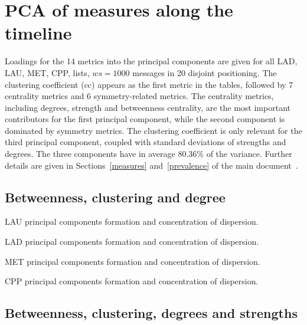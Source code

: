 \documentclass[%
 aip,
 jmp,%
 amsmath,amssymb,
 reprint,%
 floatfix,
]{revtex4-1}
\begin{document}
\FloatBarrier
\section{PCA of measures along the timeline}\label{si:pcat}
Loadings for the 14 metrics into the principal components are given for all LAD, LAU, MET, CPP, lists, $ws=1000$ messages in 20 disjoint positioning.
The clustering coefficient (cc) appears as the first metric in the tables, followed by 7 centrality metrics and 6 symmetry-related metrics.
The centrality metrics, including degrees, strength and betweenness centrality, are the most important contributors for the first principal component, while the second component is dominated by symmetry metrics.
The clustering coefficient is only relevant for the third principal component, coupled with standard deviations of strengths and degrees.
The three components have in average 80.36\% of the variance.
Further details are given in Sections~\ref{measures} and~\ref{prevalence} of the main document~\cite{tpaper}.

\subsection{Betweenness, clustering and degree}

\begin{table}[!h]
	\caption{LAU principal components formation and concentration of dispersion.}
	\footnotesize
	
\label{tab:pcain}
\end{table}

\begin{table}[!h]
	\caption{LAD principal components formation and concentration of dispersion.}
	\footnotesize
	
\label{tab:pcain}
\end{table}

\begin{table}[!h]
	\caption{MET principal components formation and concentration of dispersion.}
	\footnotesize
	
\label{tab:pcain}
\end{table}

\begin{table}[!h]
	\caption{CPP principal components formation and concentration of dispersion.}
	\footnotesize
	
\label{tab:pcain}
\end{table}

\FloatBarrier
\subsection{Betweenness, clustering, degrees and strengths}
\end{document}
